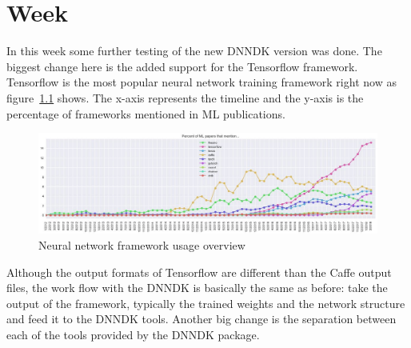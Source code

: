 \chapter{Week}
In this week some further testing of the new \ac{DNNDK} version was done. The biggest change here is the added support for the Tensorflow framework. Tensorflow is the most popular neural network training framework right now as figure~\ref{fig:nnframeworks} shows. The x-axis represents the timeline and the y-axis is the percentage of frameworks mentioned in \ac{ML} publications.
\begin{figure}[!htb]
	\centering
		\includegraphics[width=\textwidth]{bilder/nnframeworks.jpg}
		\caption{Neural network framework usage overview \cite{frameworks}}
		\label{fig:nnframeworks}
\end{figure}
Although the output formats of Tensorflow are different than the Caffe output files, the work flow with the \ac{DNNDK} is basically the same as before: take the output of the framework, typically the trained weights and the network structure and feed it to the \ac{DNNDK} tools. Another big change is the separation between each of the tools provided by the \ac{DNNDK} package.
